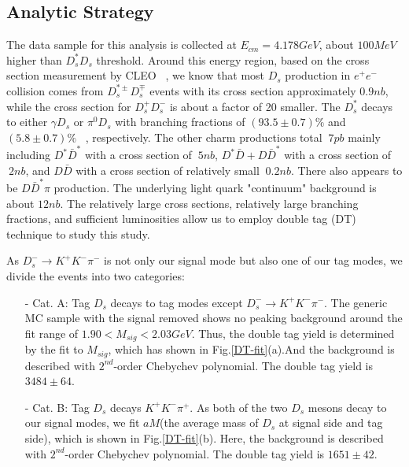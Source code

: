 \par{
    \subsection{Analytic Strategy}
    The data sample for this analysis is collected at $E_{cm}=4.178GeV$, about $100MeV$ higher than $D_{s}^{*}D_{s}$ threshold. Around this energy region, based on the cross section measurement by CLEO ~\cite{PRD80-072001}, we know that most $D_{s}$ production in $e^{+}e^{-}$ collision comes from $D_{s}^{*\pm}D_{s}^{\mp}$ events with its cross section approximately $0.9nb$, while the cross section for $D_{s}^{+}D_{s}^{-}$ is about a factor of 20 smaller.
    The $D_{s}^{*}$ decays to either $\gamma D_{s}$ or $\pi^{0}D_{s}$ with branching fractions of $(93.5\pm0.7)\%$ and $(5.8\pm0.7)\%$ ~\cite{PDG2018}, respectively. 
    The other charm productions total $~7pb$ mainly including $D^{*}\bar{D}^{*}$ with a cross section of $~5nb$, $D^{*}\bar{D} + D\bar{D}^{*}$ with a cross section of $~2nb$, and $D\bar{D}$ with a cross section of relatively small $~0.2 nb$.
    There also appears to be $D\bar{D}^{*}\pi$ production.
    The underlying light quark "continuum" background is about $12 nb$. 
    The relatively large cross sections, relatively large branching fractions, and sufficient luminosities allow us to employ double tag (DT) technique to study this study.

    As $D_{s}^{-} \rightarrow K^{+}K^{-}\pi^{-}$ is not only our signal mode but also one of our tag modes, we divide the events into two categories:

    \begin{itemize}
        \item[-] Cat. A: Tag $D_{s}$ decays to tag modes except $D_{s}^{-} \rightarrow K^{+}K^{-}\pi^{-}$. The generic MC sample with the signal removed shows no peaking background around the fit range of $1.90 < M_{sig} < 2.03 GeV$.
            Thus, the double tag yield is determined by the fit to $M_{sig}$, which has shown in Fig.\ref{DT-fit}(a).And the background is described with $2^{nd}$-order Chebychev polynomial. The double tag yield is $3484\pm64$. 
        \item[-] Cat. B: Tag $D_{s}$ decays $K^{+}K^{-}\pi^{+}$. As both of the two $D_{s}$ mesons decay to our signal modes, we fit $aM$(the average mass of $D_{s}$ at signal side and tag side), which is shown in Fig.\ref{DT-fit}(b). 
            Here, the background is described with $2^{nd}$-order Chebychev polynomial. The double tag yield is $1651\pm42$. 
    \end{itemize}

}
